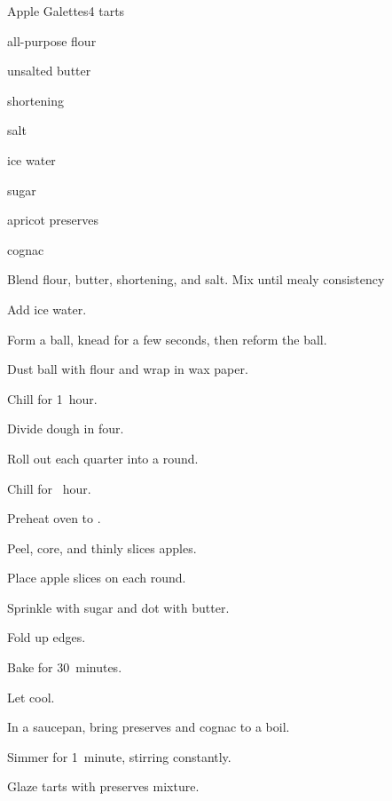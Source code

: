 \begin{recipe}{Apple Galettes}{}{4 tarts}

\begin{ingredients}
\item \C{1\quarter} all-purpose flour
\item {} unsalted butter
\item {} shortening
\item \tp{\quarter} salt
\item {} ice water
\item {}
\item sugar
\item \C{\half} apricot preserves
\item {} cognac
\end{ingredients}

\begin{directions}
\item Blend flour, butter, shortening, and salt. Mix until mealy consistency
\item Add ice water.
\item Form a ball, knead for a few seconds, then reform the ball.
\item Dust ball with flour and wrap in wax paper.
\item Chill for 1~hour.
\item Divide dough in four.
\item Roll out each quarter into a  round.
\item Chill for \half~hour.
\item Preheat oven to .
\item Peel, core, and thinly slices apples.
\item Place apple slices on each round.
\item Sprinkle with sugar and dot with butter.
\item Fold up edges.
\item Bake for 30~minutes.
\item Let cool.
\item In a saucepan, bring preserves and cognac to a boil.
\item Simmer for 1~minute, stirring constantly.
\item Glaze tarts with preserves mixture.
\end{directions}

\end{recipe}
